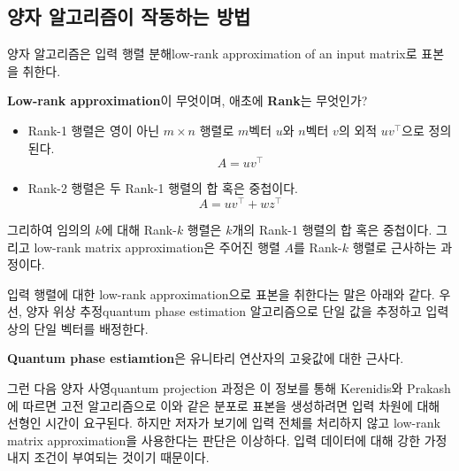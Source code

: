 \documentclass[a4paper,atbegshi,chapter]{oblivoir}
\begin{document}
\subsection{양자 알고리즘이 작동하는 방법}
양자 알고리즘은 입력 행렬 분해{\tiny low-rank approximation of an input matrix}로
표본을 취한다. 
\begin{mdframed}
  \textbf{Low-rank approximation}이 무엇이며, 애초에 \textbf{Rank}는 무엇인가?
  \begin{itemize}
    \item Rank-1 행렬은 영이 아닌 $m\times n$ 행렬로 $m$벡터 $u$와 $n$벡터 $v$의
      외적 $uv^{\top}$으로 정의된다.
      \[
        A=uv^{\top}
      \]
    \item Rank-2 행렬은 두 Rank-1 행렬의 합 혹은 중첩이다.
      \[
        A=uv^{\top}+wz^{\top}
      \]
  \end{itemize}
  그리하여 임의의 $k$에 대해 Rank-$k$ 행렬은 $k$개의 Rank-1 행렬의 합 혹은
  중첩이다. 그리고 low-rank matrix approximation은 주어진 행렬 $A$를 Rank-$k$
  행렬로 근사하는 과정이다.  
\end{mdframed}
입력 행렬에 대한 low-rank approximation으로 표본을 취한다는 말은 아래와 같다.
우선, 양자 위상 추정{\tiny quantum phase estimation} 알고리즘으로 단일 값을
추정하고 입력상의 단일 벡터를 배정한다. 
\begin{mdframed}
  \textbf{Quantum phase estiamtion}은 유니타리 연산자의 고윳값에 대한 근사다.
\end{mdframed}
그런 다음 양자 사영{\tiny quantum projection} 과정은 이 정보를 통해 
Kerenidis와 Prakash에 따르면 고전 알고리즘으로 이와 같은 분포로 표본을
생성하려면 입력 차원에 대해 선형인 시간이 요구된다. 하지만 저자가 보기에
입력 전체를 처리하지 않고 low-rank matrix approximation을 사용한다는 판단은
이상하다. 입력 데이터에 대해 강한 가정 내지 조건이 부여되는 것이기 때문이다.
\end{document}
